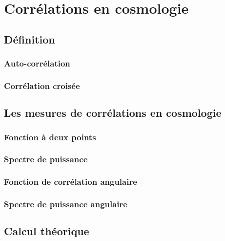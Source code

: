 
\chapter{Corrélations en cosmologie} %

\label{Chapter4} %



\section{Définition}
\subsection{Auto-corrélation}
\subsection{Corrélation croisée}
\section{Les mesures de corrélations en cosmologie}
\subsection{Fonction à deux points}
\subsection{Spectre de puissance}
\subsection{Fonction de corrélation angulaire}
\subsection{Spectre de puissance angulaire}

\section{Calcul théorique}
